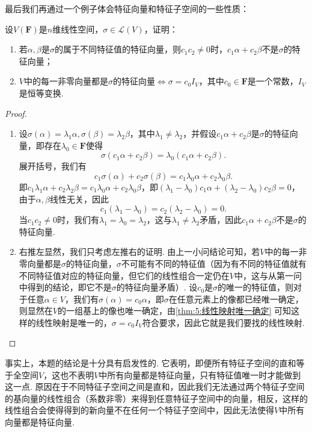 最后我们再通过一个例子体会特征向量和特征子空间的一些性质：
\begin{example}
    设$V(\mathbf{F})$是$n$维线性空间，$\sigma\in \mathcal{L}(V)$，证明：
    \begin{enumerate}
        \item 若$\alpha,\beta$是$\sigma$的属于不同特征值的特征向量，则$c_1c_2\neq 0$时，$c_1\alpha+c_2\beta$不是$\sigma$的特征向量；

        \item $V$中的每一非零向量都是$\sigma$的特征向量$\iff\sigma=c_0I_V$，其中$c_0\in\mathbf{F}$是一个常数，$I_V$是恒等变换.
    \end{enumerate}
\end{example}

\begin{proof}
    \begin{enumerate}
        \item 设$\sigma(\alpha)=\lambda_1\alpha,\sigma(\beta)=\lambda_2\beta$，其中$\lambda_1\neq\lambda_2$，并假设$c_1\alpha+c_2\beta$是$\sigma$的特征向量，即存在$\lambda_0\in\mathbf{F}$使得
              \[\sigma(c_1\alpha+c_2\beta)=\lambda_0(c_1\alpha+c_2\beta).\]
              展开括号，我们有
              \[c_1\sigma(\alpha)+c_2\sigma(\beta)=c_1\lambda_0\alpha+c_2\lambda_0\beta.\]
              即$c_1\lambda_1\alpha+c_2\lambda_2\beta=c_1\lambda_0\alpha+c_2\lambda_0\beta$，即$(\lambda_1-\lambda_0)c_1\alpha+(\lambda_2-\lambda_0)c_2\beta=0$，由于$\alpha,\beta$线性无关，因此
              \[c_1(\lambda_1-\lambda_0)=c_2(\lambda_2-\lambda_0)=0.\]
              当$c_1c_2\neq 0$时，我们有$\lambda_1=\lambda_0=\lambda_2$，这与$\lambda_1\neq\lambda_2$矛盾，因此$c_1\alpha+c_2\beta$不是$\sigma$的特征向量.

        \item 右推左显然，我们只考虑左推右的证明. 由上一小问结论可知，若$V$中的每一非零向量都是$\sigma$的特征向量，$\sigma$不可能有不同的特征值（因为有不同的特征值就有不同特征值对应的特征向量，但它们的线性组合一定仍在$V$中，这与从第一问中得到的结论，即它不是$\sigma$的特征向量矛盾）. 设$c_0$是$\sigma$的唯一的特征值，则对于任意$\alpha\in V$，我们有$\sigma(\alpha)=c_0\alpha$，即$\sigma$在任意元素上的像都已经唯一确定，则显然在$V$的一组基上的像也唯一确定，由\autoref{thm:5:线性映射唯一确定} 可知这样的线性映射是唯一的，$\sigma=c_0I_V$符合要求，因此它就是我们要找的线性映射.
    \end{enumerate}
\end{proof}

事实上，本题的结论是十分具有启发性的. 它表明，即便所有特征子空间的直和等于全空间$V$，这也不表明$V$中所有向量都是特征向量，只有特征值唯一时才能做到这一点. 原因在于不同特征子空间之间是直和，因此我们无法通过两个特征子空间的基向量的线性组合（系数非零）来得到任意特征子空间中的向量，相反，这样的线性组合会使得得到的新向量不在任何一个特征子空间中，因此无法使得$V$中所有向量都是特征向量.

